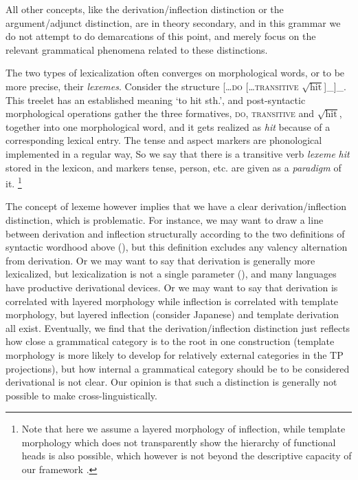 \documentclass[UTF8, a4paper, oneside, scheme=plain, 12pt]{ctexrep}
\newcommand*{\term}[1]{\emph{#1}}
\newcommand{\form}[1]{\emph{#1}}
\newcommand{\translate}[1]{`#1'}
\newcommand*{\category}[1]{\textsc{#1}}
\newcommand*{\wordroot}[1]{$\sqrt{\text{#1}}$}
\begin{document}
{All other concepts, like the derivation/inflection distinction
or the argument/adjunct distinction, are in theory secondary,
and in this grammar we do not attempt to do demarcations of this point,
and merely focus on the relevant grammatical phenomena related to these distinctions.

The two types of lexicalization often converges on morphological words,
or to be more precise, their \emph{lexemes}.
Consider the structure [\dots \category{do} [\dots \category{transitive} \wordroot{hit}]_{}]_{}.
This treelet has an established meaning \translate{to hit sth.},
and post-syntactic morphological operations gather the three formatives,
\category{do}, \category{transitive} and \wordroot{hit}, together into one morphological word,
and it gets realized as \form{hit} because of a corresponding lexical entry.
The tense and aspect markers are phonological implemented in a regular way,
So we say that there is a transitive verb \term{lexeme} \form{hit} stored in the lexicon,
and markers tense, person, etc. are given as a \term{paradigm} of it.%
\footnote{
    Note that here we assume a layered morphology of inflection,
    while template morphology which does not transparently show the hierarchy of functional heads
    is also possible, which however is not beyond the descriptive capacity of our framework
    \citep{bye2020morpheme}.
}

The concept of lexeme however implies that we have a clear derivation/inflection distinction, which is problematic.
For instance, we may want to draw a line between derivation and inflection structurally
according to the two definitions of syntactic wordhood above (),
but this definition excludes any valency alternation from derivation.
Or we may want to say that derivation is generally more lexicalized,
but lexicalization is not a single parameter (),
and many languages have productive derivational devices.
Or we may want to say that derivation is correlated with layered morphology
while inflection is correlated with template morphology,
but layered inflection (consider Japanese)
and template derivation all exist.
Eventually, we find that the derivation/inflection distinction
just reflects how close a grammatical category is to the root in one construction
(template morphology is more likely to develop for
relatively external categories in the TP projections),
but how internal a grammatical category should be to be considered derivational is not clear.
Our opinion is that such a distinction is generally not possible to make cross-linguistically.

}
\end{document}
